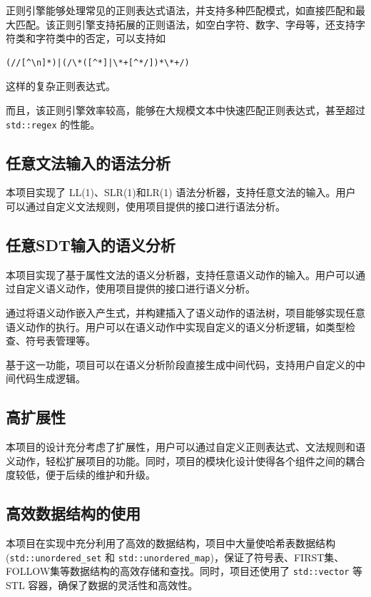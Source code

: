 \documentclass[a4paper]{article}
\begin{document}
正则引擎能够处理常见的正则表达式语法，并支持多种匹配模式，如直接匹配和最大匹配。该正则引擎支持拓展的正则语法，如空白字符、数字、字母等，还支持字符类和字符类中的否定，可以支持如
\begin{lstlisting}[numbers=none]
(//[^\n]*)|(/\*([^*]|\*+[^*/])*\*+/)
\end{lstlisting}
这样的复杂正则表达式。

而且，该正则引擎效率较高，能够在大规模文本中快速匹配正则表达式，甚至超过 \texttt{std::regex} 的性能。

\subsection{任意文法输入的语法分析}

本项目实现了 LL(1)、SLR(1)和LR(1) 语法分析器，支持任意文法的输入。用户可以通过自定义文法规则，使用项目提供的接口进行语法分析。

\subsection{任意SDT输入的语义分析}

本项目实现了基于属性文法的语义分析器，支持任意语义动作的输入。用户可以通过自定义语义动作，使用项目提供的接口进行语义分析。

通过将语义动作嵌入产生式，并构建插入了语义动作的语法树，项目能够实现任意语义动作的执行。用户可以在语义动作中实现自定义的语义分析逻辑，如类型检查、符号表管理等。

基于这一功能，项目可以在语义分析阶段直接生成中间代码，支持用户自定义的中间代码生成逻辑。

\subsection{高扩展性}

本项目的设计充分考虑了扩展性，用户可以通过自定义正则表达式、文法规则和语义动作，轻松扩展项目的功能。同时，项目的模块化设计使得各个组件之间的耦合度较低，便于后续的维护和升级。

\subsection{高效数据结构的使用}
本项目在实现中充分利用了高效的数据结构，项目中大量使哈希表数据结构(\texttt{std::unordered\_set} 和 \texttt{std::unordered\_map})，保证了符号表、FIRST集、FOLLOW集等数据结构的高效存储和查找。同时，项目还使用了 \texttt{std::vector} 等 STL 容器，确保了数据的灵活性和高效性。
\end{document}
